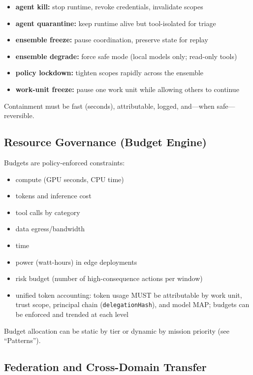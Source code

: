 \documentclass[11pt]{article}
\begin{document}
\begin{itemize}
\tightlist
\item
  \textbf{agent kill:} stop runtime, revoke credentials, invalidate
  scopes
\item
  \textbf{agent quarantine:} keep runtime alive but tool-isolated for
  triage
\item
  \textbf{ensemble freeze:} pause coordination, preserve state for
  replay
\item
  \textbf{ensemble degrade:} force safe mode (local models only;
  read-only tools)
\item
  \textbf{policy lockdown:} tighten scopes rapidly across the ensemble
\item
  \textbf{work-unit freeze:} pause one work unit while allowing others
  to continue
\end{itemize}

Containment must be fast (seconds), attributable, logged, and---when
safe---reversible.

\hypertarget{resource-governance-budget-engine}{%
\subsection{Resource Governance (Budget Engine)}\label{resource-governance-budget-engine}}

Budgets are policy-enforced constraints:

\begin{itemize}
\tightlist
\item
  compute (GPU seconds, CPU time)
\item
  tokens and inference cost
\item
  tool calls by category
\item
  data egress/bandwidth
\item
  time
\item
  power (watt-hours) in edge deployments
\item
  risk budget (number of high-consequence actions per window)
\item
  unified token accounting: token usage MUST be attributable by work
  unit, trust scope, principal chain (\texttt{delegationHash}), and
  model MAP; budgets can be enforced and trended at each level
\end{itemize}

Budget allocation can be static by tier or dynamic by mission priority
(see ``Patterns'').

\hypertarget{federation-and-cross-domain-transfer}{%
\subsection{Federation and Cross-Domain Transfer}\label{federation-and-cross-domain-transfer}}
\end{document}
